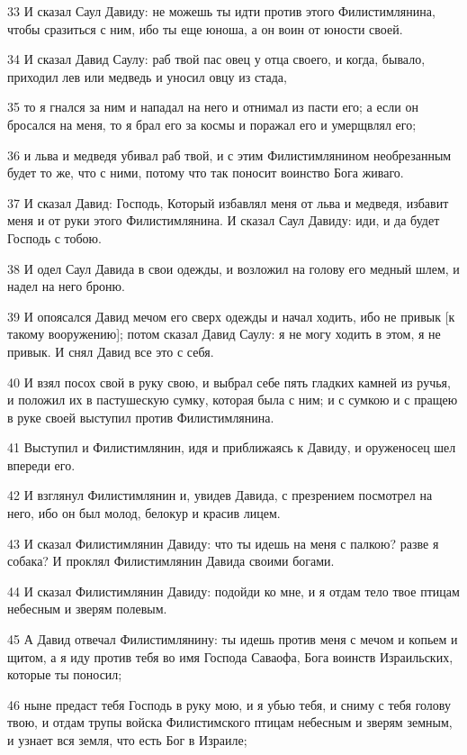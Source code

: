 \par 33 И сказал Саул Давиду: не можешь ты идти против этого Филистимлянина, чтобы сразиться с ним, ибо ты еще юноша, а он воин от юности своей.
\par 34 И сказал Давид Саулу: раб твой пас овец у отца своего, и когда, бывало, приходил лев или медведь и уносил овцу из стада,
\par 35 то я гнался за ним и нападал на него и отнимал из пасти его; а если он бросался на меня, то я брал его за космы и поражал его и умерщвлял его;
\par 36 и льва и медведя убивал раб твой, и с этим Филистимлянином необрезанным будет то же, что с ними, потому что так поносит воинство Бога живаго.
\par 37 И сказал Давид: Господь, Который избавлял меня от льва и медведя, избавит меня и от руки этого Филистимлянина. И сказал Саул Давиду: иди, и да будет Господь с тобою.
\par 38 И одел Саул Давида в свои одежды, и возложил на голову его медный шлем, и надел на него броню.
\par 39 И опоясался Давид мечом его сверх одежды и начал ходить, ибо не привык [к такому вооружению]; потом сказал Давид Саулу: я не могу ходить в этом, я не привык. И снял Давид все это с себя.
\par 40 И взял посох свой в руку свою, и выбрал себе пять гладких камней из ручья, и положил их в пастушескую сумку, которая была с ним; и с сумкою и с пращею в руке своей выступил против Филистимлянина.
\par 41 Выступил и Филистимлянин, идя и приближаясь к Давиду, и оруженосец шел впереди его.
\par 42 И взглянул Филистимлянин и, увидев Давида, с презрением посмотрел на него, ибо он был молод, белокур и красив лицем.
\par 43 И сказал Филистимлянин Давиду: что ты идешь на меня с палкою? разве я собака? И проклял Филистимлянин Давида своими богами.
\par 44 И сказал Филистимлянин Давиду: подойди ко мне, и я отдам тело твое птицам небесным и зверям полевым.
\par 45 А Давид отвечал Филистимлянину: ты идешь против меня с мечом и копьем и щитом, а я иду против тебя во имя Господа Саваофа, Бога воинств Израильских, которые ты поносил;
\par 46 ныне предаст тебя Господь в руку мою, и я убью тебя, и сниму с тебя голову твою, и отдам трупы войска Филистимского птицам небесным и зверям земным, и узнает вся земля, что есть Бог в Израиле;
